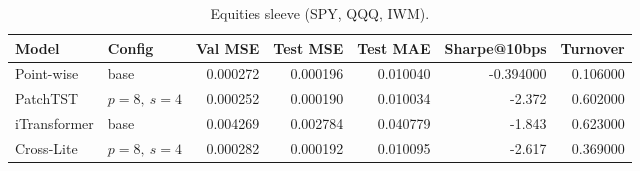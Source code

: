 \begin{table}
\caption{Equities sleeve (SPY, QQQ, IWM).}
\label{tab:equities_h1}
\begin{tabular}{l l r r r r r}
\toprule
Model & Config & Val MSE & Test MSE & Test MAE & Sharpe@10bps & Turnover \\
\midrule
Point-wise & base & 0.000272 & 0.000196 & 0.010040 & -0.394000 & 0.106000 \\
PatchTST & $p=8,\ s=4$ & 0.000252 & 0.000190 & 0.010034 & -2.372 & 0.602000 \\
iTransformer & base & 0.004269 & 0.002784 & 0.040779 & -1.843 & 0.623000 \\
Cross-Lite & $p=8,\ s=4$ & 0.000282 & 0.000192 & 0.010095 & -2.617 & 0.369000 \\
\bottomrule
\end{tabular}
\end{table}
